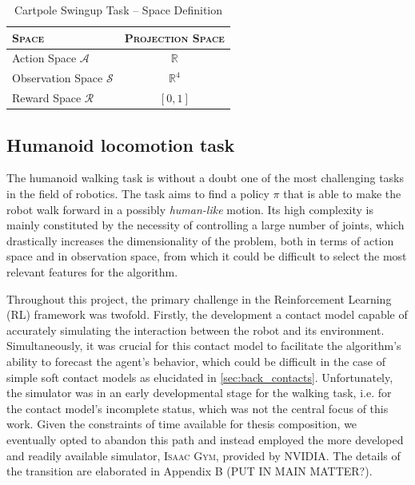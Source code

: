 \begin{table}
    \centering
    \label{tab:cartpoleswinguptaskspacedef}
    \begin{tabular}{l c}
        \toprule
        \textsc{Space}                  & \textsc{Projection Space} \\
        \midrule
        Action Space $\mathcal{A}$      & $\mathbb{R}$              \\
        Observation Space $\mathcal{S}$ & $\mathbb{R} ^{4}$         \\
        Reward Space $\mathcal{R}$      & $[0,1]$                   \\
        \bottomrule
    \end{tabular}
    \caption{Cartpole Swingup Task -- Space Definition}
\end{table}


\subsection{Humanoid locomotion task}
The humanoid walking task is without a doubt one of the most challenging tasks in the field of robotics. The task aims to find a policy $\pi$ that is able to make the robot walk forward in a possibly \textit{human-like} motion. Its high complexity is mainly constituted by the necessity of controlling a large number of joints, which drastically increases the dimensionality of the problem, both in terms of action space and in observation space, from which it could be difficult to select the most relevant features for the algorithm.

Throughout this project, the primary challenge in the Reinforcement Learning (\ac{RL}) framework was twofold. Firstly, the development a contact model capable of accurately simulating the interaction between the robot and its environment. Simultaneously, it was crucial for this contact model to facilitate the algorithm's ability to forecast the agent's behavior, which could be difficult in the case of simple soft contact models as elucidated in \cref{sec:back_contacts}. Unfortunately, the simulator was in an early developmental stage for the walking task, i.e. for the contact model's incomplete status, which was not the central focus of this work. Given the constraints of time available for thesis composition, we eventually opted to abandon this path and instead employed the more developed and readily available simulator, \textsc{Isaac Gym}, provided by NVIDIA. The details of the transition are elaborated in Appendix B (PUT IN MAIN MATTER?).

